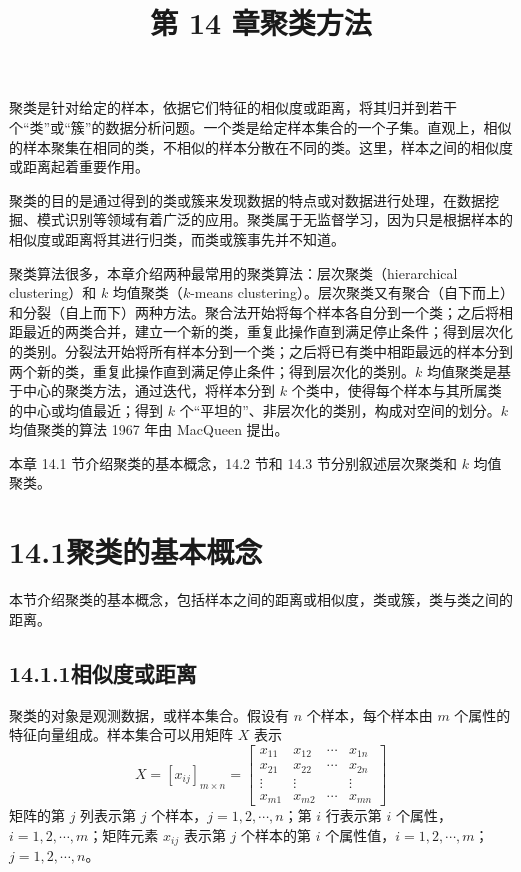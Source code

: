 \documentclass[UTF8,12pt,a4paper,fontset=fandol]{ctexart}
\title{第 14 章\quad 聚类方法}
\author{}
\date{}
\begin{document}
\maketitle

聚类是针对给定的样本，依据它们特征的相似度或距离，将其归并到若干个“类”或“簇”的数据分析问题。一个类是给定样本集合的一个子集。直观上，相似的样本聚集在相同的类，不相似的样本分散在不同的类。这里，样本之间的相似度或距离起着重要作用。

聚类的目的是通过得到的类或簇来发现数据的特点或对数据进行处理，在数据挖掘、模式识别等领域有着广泛的应用。聚类属于无监督学习，因为只是根据样本的相似度或距离将其进行归类，而类或簇事先并不知道。

聚类算法很多，本章介绍两种最常用的聚类算法：层次聚类（hierarchical clustering）和 $k$ 均值聚类（$k$-means clustering）。层次聚类又有聚合（自下而上）和分裂（自上而下）两种方法。聚合法开始将每个样本各自分到一个类；之后将相距最近的两类合并，建立一个新的类，重复此操作直到满足停止条件；得到层次化的类别。分裂法开始将所有样本分到一个类；之后将已有类中相距最远的样本分到两个新的类，重复此操作直到满足停止条件；得到层次化的类别。$k$ 均值聚类是基于中心的聚类方法，通过迭代，将样本分到 $k$ 个类中，使得每个样本与其所属类的中心或均值最近；得到 $k$ 个“平坦的”、非层次化的类别，构成对空间的划分。$k$ 均值聚类的算法 1967 年由 MacQueen 提出。

本章 14.1 节介绍聚类的基本概念，14.2 节和 14.3 节分别叙述层次聚类和 $k$ 均值聚类。

\section*{14.1\quad 聚类的基本概念}

本节介绍聚类的基本概念，包括样本之间的距离或相似度，类或簇，类与类之间的距离。

\subsection*{14.1.1\quad 相似度或距离}

聚类的对象是观测数据，或样本集合。假设有 $n$ 个样本，每个样本由 $m$ 个属性的特征向量组成。样本集合可以用矩阵 $X$ 表示
\begin{equation}
X=[x_{ij}]_{m\times n}=
\begin{bmatrix}
x_{11} & x_{12} & \cdots & x_{1n}\\
x_{21} & x_{22} & \cdots & x_{2n}\\
\vdots & \vdots & & \vdots\\
x_{m1} & x_{m2} & \cdots & x_{mn}
\end{bmatrix}
\tag{14.1}
\end{equation}
矩阵的第 $j$ 列表示第 $j$ 个样本，$j=1,2,\cdots,n$；第 $i$ 行表示第 $i$ 个属性，$i=1,2,\cdots,m$；矩阵元素 $x_{ij}$ 表示第 $j$ 个样本的第 $i$ 个属性值，$i=1,2,\cdots,m$；$j=1,2,\cdots,n$。
\end{document}
